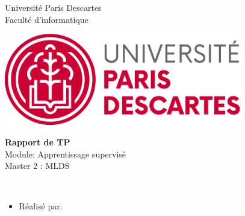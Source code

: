 \documentclass[12pt , a4paper]{report}
\begin{document}
	\begin{center}
		\normalsize{Université Paris Descartes}\\
		\normalsize{Faculté d'informatique}\\
	\end{center}
	\begin{center}
		\includegraphics[height=4cm]{../images/logo.png}
	\end{center}
	
	\begin{center}
		\Huge{\textbf{Rapport de TP}}\\
		\vspace{0.7cm}
		\large{Module: Apprentissage supervisé}\\
		\vspace{0.2cm}
		\large{Master 2 : MLDS}\\
		\vspace{1.5cm}
	\end{center}
	\vspace{3cm}
	\\
	\begin{itemize}
		\item{Réalisé par:}
	\end{itemize}
	
	\vspace{3cm}
	
\end{document}
